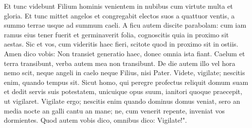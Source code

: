 \begin{biblechapter}
\verse Et tunc videbunt Filium hominis venientem in nubibus cum virtute multa et gloria. 
\verse Et tunc mittet angelos et congregabit electos suos a quattuor ventis, a summo terrae usque ad summum caeli. 
\verse A ficu autem discite parabolam: cum iam ramus eius tener fuerit et germinaverit folia, cognoscitis quia in proximo sit aestas. 
\verse Sic et vos, cum videritis haec fieri, scitote quod in proximo sit in ostiis. 
\verse Amen dico vobis: Non transiet generatio haec, donec omnia ista fiant. 
\verse Caelum et terra transibunt, verba autem mea non transibunt. 
\verse De die autem illo vel hora nemo scit, neque angeli in caelo neque Filius, nisi Pater. 
\verse Videte, vigilate; nescitis enim, quando tempus sit. 
\verse Sicut homo, qui peregre profectus reliquit domum suam et dedit servis suis potestatem, unicuique opus suum, ianitori quoque praecepit, ut vigilaret. 
\verse Vigilate ergo; nescitis enim quando dominus domus veniat, sero an media nocte an galli cantu an mane; 
\verse ne, cum venerit repente, inveniat vos dormientes. 
\verse Quod autem vobis dico, omnibus dico: Vigilate!". 
\end{biblechapter}

